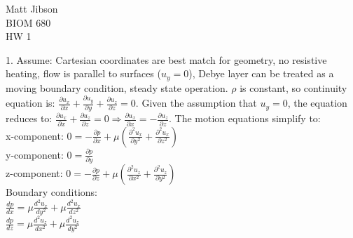 \documentclass{article}
\begin{document}
\begin{flushright}
Matt Jibson \\
BIOM 680 \\
HW 1
\end{flushright}

1. Assume: Cartesian coordinates are best match for geometry, no resistive heating, flow is parallel to surfaces ($u_{y} = 0$), Debye layer can be treated as a moving boundary condition, steady state operation. $\rho$ is constant, so continuity equation is: $\frac{\partial u_{x}}{\partial x} + \frac{\partial u_{y}}{\partial y} + \frac{\partial u_{z}}{\partial z} = 0$. Given the assumption that $u_{y} = 0$, the equation reduces to: $\frac{\partial u_{x}}{\partial x} + \frac{\partial u_{z}}{\partial z} = 0 \Rightarrow \frac{\partial u_{x}}{\partial x} = - \frac{\partial u_{z}}{\partial z}$.
The motion equations simplify to:\\
%
%
x-component: $0 = - \frac{\partial p}{\partial x} + \mu(\frac{\partial^{2}u_{x}}{\partial y^{2}} + \frac{\partial^{2}u_{x}}{\partial z^{2}})$ \\
y-component: $0 = \frac{\partial p}{\partial y}$ \\
z-component: $0 = - \frac{\partial p}{\partial z} + \mu(\frac{\partial^{2}u_{z}}{\partial x^{2}} + \frac{\partial^{2}u_{z}}{\partial y^{2}})$ \\
Boundary conditions: \\
$\frac{dp}{dx} = \mu\frac{d^{2}u_{x}}{dy^{2}} + \mu\frac{d^{2}u_{x}}{dz^{2}}$ \\
$\frac{dp}{dz} = \mu\frac{d^{2}u_{z}}{dx^{2}} + \mu\frac{d^{2}u_{z}}{dy^{2}}$ \\
\end{document}
